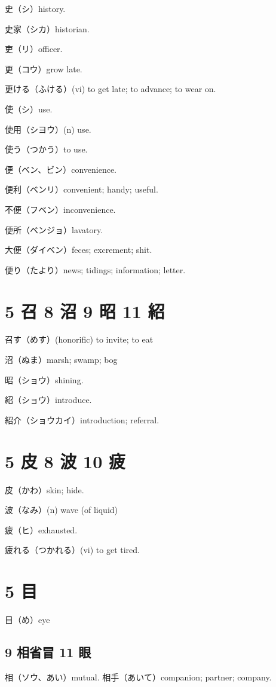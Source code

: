 史（シ）history.

史家（シカ）historian.

吏（リ）officer.

更（コウ）grow late.

更ける（ふける）(vi) to get late; to advance; to wear on.

使（シ）use.

使用（シヨウ）(n) use.

使う（つかう）to use.

便（ベン、ビン）convenience.

便利（ベンリ）convenient; handy; useful.

不便（フベン）inconvenience.

便所（ベンジョ）lavatory.

大便（ダイベン）feces; excrement; shit.

便り（たより）news; tidings; information; letter.

\section{5 召 8 沼 9 昭 11 紹}

召す（めす）(honorific) to invite; to eat

沼（ぬま）marsh; swamp; bog

昭（ショウ）shining.

紹（ショウ）introduce.

紹介（ショウカイ）introduction; referral.

\section{5 皮 8 波 10 疲}

皮（かわ）skin; hide.

波（なみ）(n) wave (of liquid)

疲（ヒ）exhausted.

疲れる（つかれる）(vi) to get tired.

\section{5 目}

目（め）eye

\subsection{9 相省冒 11 眼}

相（ソウ、あい）mutual.
相手（あいて）companion; partner; company.

